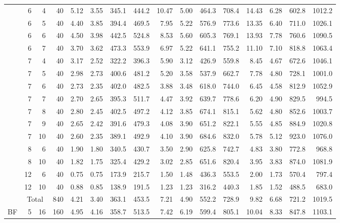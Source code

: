 \begin{table}[p]
{\begin{tabular}{@{} c r r r @{\hspace{\bbGroupSep}} *{4}{r} @{\hspace{\bbGroupSep}} *{4}{r} @{\hspace{\bbGroupSep}} *{4}{r} @{}}
     & 6 & 4 & 40 & 5.12 & 3.55 & 345.1 & 444.2 & 10.47 & 5.00 & 464.3 & 708.4 & 14.43 & 6.28 & 602.8 & 1012.2 \\
     & 6 & 5 & 40 & 4.40 & 3.85 & 394.4 & 469.5 & 7.95 & 5.22 & 576.9 & 773.6 & 13.35 & 6.40 & 711.0 & 1026.1 \\
     & 6 & 6 & 40 & 4.50 & 3.98 & 442.5 & 524.8 & 8.53 & 5.60 & 605.3 & 769.1 & 13.93 & 7.78 & 760.6 & 1090.5 \\
     & 6 & 7 & 40 & 3.70 & 3.62 & 473.3 & 553.9 & 6.97 & 5.22 & 641.1 & 755.2 & 11.10 & 7.10 & 818.8 & 1063.4 \\
     & 7 & 4 & 40 & 3.17 & 2.52 & 322.2 & 396.3 & 5.90 & 3.12 & 426.9 & 559.8 & 8.45 & 4.67 & 672.6 & 1046.1 \\
     & 7 & 5 & 40 & 2.98 & 2.73 & 400.6 & 481.2 & 5.20 & 3.58 & 537.9 & 662.7 & 7.78 & 4.80 & 728.1 & 1001.0 \\
     & 7 & 6 & 40 & 2.73 & 2.35 & 402.0 & 482.5 & 3.88 & 3.48 & 618.0 & 744.0 & 6.45 & 4.58 & 812.9 & 1052.9 \\
     & 7 & 7 & 40 & 2.70 & 2.65 & 395.3 & 511.7 & 4.47 & 3.92 & 639.7 & 778.6 & 6.20 & 4.90 & 829.5 & 994.5 \\
     & 7 & 8 & 40 & 2.80 & 2.45 & 402.5 & 497.2 & 4.12 & 3.85 & 674.1 & 815.1 & 5.62 & 4.80 & 852.6 & 1003.7 \\
     & 7 & 9 & 40 & 2.65 & 2.42 & 391.6 & 479.3 & 4.08 & 3.90 & 651.2 & 822.1 & 5.55 & 4.85 & 884.9 & 1020.8 \\
     & 7 & 10 & 40 & 2.60 & 2.35 & 389.1 & 492.9 & 4.10 & 3.90 & 684.6 & 832.0 & 5.78 & 5.12 & 923.0 & 1076.0 \\
     & 8 & 6 & 40 & 1.90 & 1.80 & 340.5 & 430.7 & 3.50 & 2.90 & 625.8 & 742.7 & 4.83 & 3.80 & 772.8 & 968.8 \\
     & 8 & 10 & 40 & 1.82 & 1.75 & 325.4 & 429.2 & 3.02 & 2.85 & 651.6 & 820.4 & 3.95 & 3.83 & 874.0 & 1081.9 \\
     & 12 & 6 & 40 & 0.75 & 0.75 & 173.9 & 215.7 & 1.50 & 1.48 & 436.3 & 553.5 & 2.00 & 1.73 & 570.4 & 797.4 \\
     & 12 & 10 & 40 & 0.88 & 0.85 & 138.9 & 191.5 & 1.23 & 1.23 & 316.2 & 440.3 & 1.85 & 1.52 & 488.5 & 683.0 \\
    \cmidrule{2-16}
     & \multicolumn{2}{c}{Total} & 840 & 4.21 & 3.40 & 363.1 & 453.5 & 7.21 & 4.90 & 552.2 & 728.9 & 9.82 & 6.68 & 721.2 & 1019.5 \\
    \cmidrule{1-16}
    \multirow{5}{*}{BF} & 5 & 16 & 160 & 4.95 & 4.16 & 358.7 & 513.5 & 7.42 & 6.19 & 599.4 & 805.1 & 10.04 & 8.33 & 847.8 & 1103.1 \\

\end{tabular}}
\end{table}
